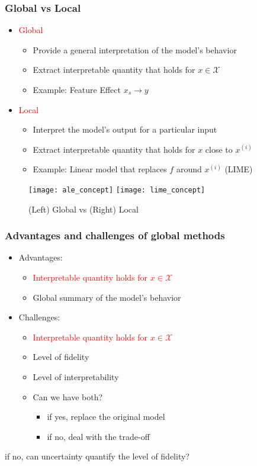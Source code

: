 \begin{frame}
  \frametitle{Global vs Local}
  \begin{itemize}
    \item \textcolor{red}{Global}
    \begin{itemize}
      \item Provide a general interpretation of the model's behavior
      \item Extract interpretable quantity that holds for $x \in \mathcal{X}$
      \item Example: Feature Effect $x_s \rightarrow y$
    \end{itemize}
    \item \textcolor{red}{Local}
    \begin{itemize}
      \item Interpret the model's output for a particular input
      \item Extract interpretable quantity that holds for $x$ close to $x^{(i)}$
      \item Example: Linear model that replaces $f$ around $x^{(i)}$ (LIME)
    \end{itemize}
  \end{itemize}

  \begin{figure}
    \centering
    \texttt{[image: ale\_concept]}
    \texttt{[image: lime\_concept]}
    \caption{(Left) Global vs (Right) Local}
    \label{fig:figure-1}
  \end{figure}
\end{frame}


\begin{frame}
  \frametitle{Advantages and challenges of global methods}

  \begin{itemize}
    \item Advantages:
    \begin{itemize}
      \item \textcolor{red}{Interpretable quantity holds for $x \in \mathcal{X}$}
      \item Global summary of the model's behavior
    \end{itemize}
    \item Challenges:
  \begin{itemize}
    \item \textcolor{red}{Interpretable quantity holds for $x \in \mathcal{X}$}
    \item Level of fidelity
    \item Level of interpretability
    \item Can we have both?
    \begin{itemize}
      \item if yes, replace the original model
      \item if no, deal with the trade-off
    \end{itemize}
  \end{itemize}
  \end{itemize}

  \noindent\makebox[\linewidth]{\rule{\paperwidth}{0.4pt}}
  if no, can uncertainty quantify the level of fidelity?
\end{frame}


